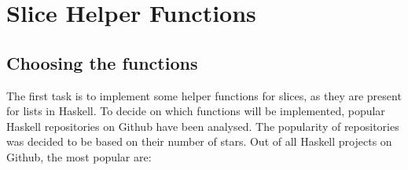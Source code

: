 

\section{Slice Helper Functions}

\subsection{Choosing the functions}

The first task is to implement some helper functions for slices, as they are present for lists in Haskell.
To decide on which functions will be implemented, popular Haskell repositories on Github have been analysed. The
popularity of repositories was decided to be based on their number of stars. Out of all Haskell projects
on Github, the most popular are\cite{github-popular-haskell}:

